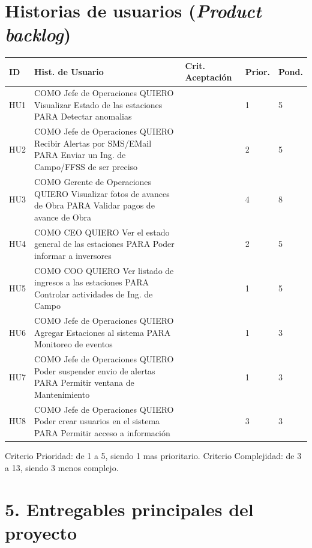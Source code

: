 \documentclass[11pt]{charter}
\begin{document}
\section{Historias de usuarios (\textit{Product backlog})}
\label{sec:backlog}

\begin{consigna} 
\begin{table}
\begin{tabularx}{\linewidth}{@{}|l|X|X|l|l|@{}}
\hline
\rowcolor[HTML]{C0C0C0} 
ID  & Hist. de Usuario & Crit. Aceptación & Prior. & Pond. \\ \hline
HU1 & COMO Jefe de Operaciones 
QUIERO Visualizar Estado de las estaciones 
PARA Detectar anomalias      & 	 & 1   & 5 	\\ \hline
HU2 & COMO Jefe de Operaciones 
QUIERO Recibir Alertas por SMS/EMail 
PARA Enviar un Ing. de Campo/FFSS de ser preciso   & 	& 2     & 5 	\\ \hline
HU3 & COMO Gerente de Operaciones 
QUIERO Visualizar fotos de avances de Obra 
PARA Validar pagos de avance de Obra  & 	&  4  & 8   	\\ \hline
HU4 & COMO CEO 
QUIERO Ver el estado general de las estaciones  
PARA Poder informar a inversores       & &  2 & 5	\\ \hline
HU5 & COMO COO 
QUIERO Ver listado de ingresos a las estaciones 
PARA Controlar actividades de Ing. de Campo &           	&   1  & 5  	\\ \hline
HU6 & COMO Jefe de Operaciones 
QUIERO Agregar Estaciones al sistema 
PARA Monitoreo de eventos  &  	& 1  & 3 \\ \hline
HU7 & COMO Jefe de Operaciones 
QUIERO Poder suspender envio de alertas 
PARA Permitir ventana de Mantenimiento  &   &  1 &  3	\\ \hline
HU8 & COMO Jefe de Operaciones 
QUIERO Poder crear usuarios en el sistema 
PARA Permitir acceso a información  &   &  3 &  3	\\ \hline

\end{tabularx}
\end{table}

Criterio Prioridad: de 1 a 5, siendo 1 mas prioritario.   
Criterio Complejidad: de 3 a 13, siendo 3 menos complejo. 


\end{consigna}

\section{5. Entregables principales del proyecto}
\label{sec:entregables}
\end{document}
